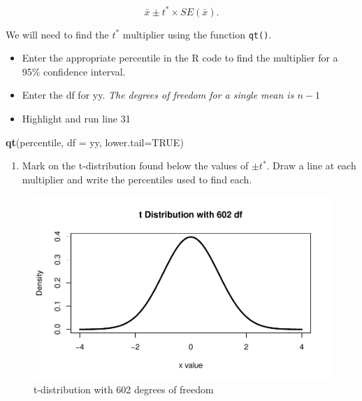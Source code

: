 \documentclass[
]{report}
\newenvironment{Shaded}{\begin{snugshade}}{\end{snugshade}}
\newcommand{\AttributeTok}[1]{\textcolor[rgb]{0.13,0.29,0.53}{#1}}
\newcommand{\ConstantTok}[1]{\textcolor[rgb]{0.56,0.35,0.01}{#1}}
\newcommand{\FunctionTok}[1]{\textcolor[rgb]{0.13,0.29,0.53}{\textbf{#1}}}
\newcommand{\NormalTok}[1]{#1}
\providecommand{\tightlist}{%
  \setlength{\itemsep}{0pt}\setlength{\parskip}{0pt}}
\begin{document}
\[\bar{x}\pm t^* \times SE(\bar{x}).\]

\newpage

We will need to find the \(t^*\) multiplier using the function \texttt{qt()}.

\begin{itemize}
\item
  Enter the appropriate percentile in the R code to find the multiplier for a 95\% confidence interval.
\item
  Enter the df for yy. \emph{The degrees of freedom for a single mean is \(n-1\)}
\item
  Highlight and run line 31
\end{itemize}

\begin{Shaded}
\begin{Highlighting}[]
\FunctionTok{qt}\NormalTok{(percentile, }\AttributeTok{df =}\NormalTok{ yy, }\AttributeTok{lower.tail=}\ConstantTok{TRUE}\NormalTok{)}
\end{Highlighting}
\end{Shaded}

\begin{enumerate}
\def\labelenumi{\arabic{enumi}.}
\setcounter{enumi}{3}
\tightlist
\item
  Mark on the t-distribution found below the values of \(\pm t^*\). Draw a line at each multiplier and write the percentiles used to find each.
  \vspace{1mm}
\end{enumerate}

\begin{figure}

{\centering \includegraphics[width=0.7\linewidth]{07-A14-onemean-CI_files/figure-latex/tstar-1} 

}

\caption{t-distribution with 602 degrees of freedom}\label{fig:tstar}
\end{figure}
\end{document}
